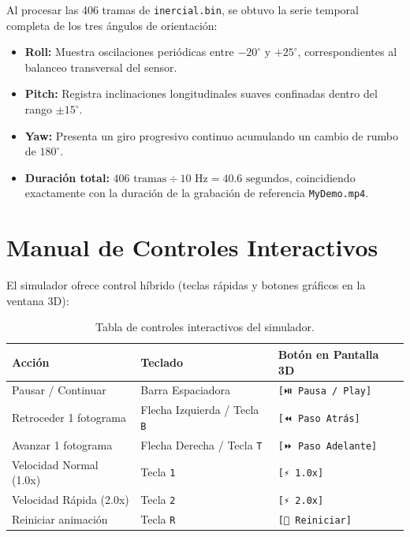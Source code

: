 \documentclass[12pt,letterpaper]{article}
\begin{document}
Al procesar las 406 tramas de \texttt{inercial.bin}, se obtuvo la serie temporal completa de los tres ángulos de orientación:
\begin{itemize}
    \item \textbf{Roll:} Muestra oscilaciones periódicas entre $-20^\circ$ y $+25^\circ$, correspondientes al balanceo transversal del sensor.
    \item \textbf{Pitch:} Registra inclinaciones longitudinales suaves confinadas dentro del rango $\pm 15^\circ$.
    \item \textbf{Yaw:} Presenta un giro progresivo continuo acumulando un cambio de rumbo de $180^\circ$.
    \item \textbf{Duración total:} $406 \text{ tramas} \div 10 \text{ Hz} = 40.6 \text{ segundos}$, coincidiendo exactamente con la duración de la grabación de referencia \texttt{MyDemo.mp4}.
\end{itemize}

\section{Manual de Controles Interactivos}

El simulador ofrece control híbrido (teclas rápidas y botones gráficos en la ventana 3D):

\begin{table}[H]
\centering
\caption{Tabla de controles interactivos del simulador.}
\label{tab:controles_p1}
\begin{tabular}{llp{7cm}}
\toprule
\textbf{Acción} & \textbf{Teclado} & \textbf{Botón en Pantalla 3D} \\
\midrule
Pausar / Continuar & Barra Espaciadora & \texttt{[⏯️ Pausa / Play]} \\
Retroceder 1 fotograma & Flecha Izquierda / Tecla \texttt{B} & \texttt{[⏪ Paso Atrás]} \\
Avanzar 1 fotograma & Flecha Derecha / Tecla \texttt{T} & \texttt{[⏩ Paso Adelante]} \\
Velocidad Normal (1.0x) & Tecla \texttt{1} & \texttt{[⚡ 1.0x]} \\
Velocidad Rápida (2.0x) & Tecla \texttt{2} & \texttt{[⚡ 2.0x]} \\
Reiniciar animación & Tecla \texttt{R} & \texttt{[🔄 Reiniciar]} \\
\bottomrule
\end{tabular}
\end{table}
\end{document}
